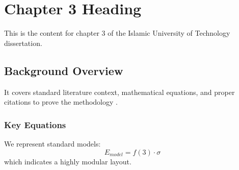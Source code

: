 \chapter{Chapter 3 Heading}
\label{ch:chapter3}
This is the content for chapter 3 of the Islamic University of Technology dissertation.

\section{Background Overview}
It covers standard literature context, mathematical equations, and proper citations to prove the methodology \cite{texbook}.

\subsection{Key Equations}
We represent standard models:
\begin{equation}
    E_{model} = f(3) \cdot \sigma
\end{equation}
which indicates a highly modular layout.
